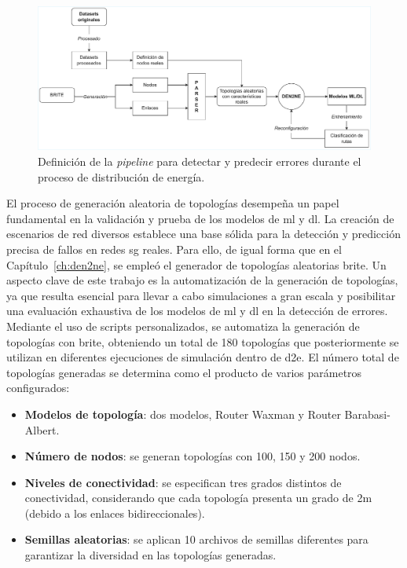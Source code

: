 \begin{figure}[H]
  \centering
  \includegraphics[width=\textwidth]{fig/06_fault_sg/fault_sg_08.drawio.pdf}
  \caption{Definición de la \textit{pipeline} para detectar y predecir errores durante el proceso de distribución de energía.}
  \label{fig:fault_sg_08}
\end{figure}


El proceso de generación aleatoria de topologías desempeña un papel fundamental en la validación y prueba de los modelos de \gls{ml} y \gls{dl}. La creación de escenarios de red diversos establece una base sólida para la detección y predicción precisa de fallos en redes \gls{sg} reales.  Para ello, de igual forma que en el Capítulo~\ref{ch:den2ne}, se empleó el generador de topologías aleatorias \gls{brite}. Un aspecto clave de este trabajo es la automatización de la generación de topologías, ya que resulta esencial para llevar a cabo simulaciones a gran escala y posibilitar una evaluación exhaustiva de los modelos de \gls{ml} y \gls{dl} en la detección de errores. Mediante el uso de scripts personalizados, se automatiza la generación de topologías con \gls{brite}, obteniendo un total de 180 topologías que posteriormente se utilizan en diferentes ejecuciones de simulación dentro de \gls{d2e}. El número total de topologías generadas se determina como el producto de varios parámetros configurados:  

\begin{itemize}
    \item \textbf{Modelos de topología}: dos modelos, Router Waxman y Router Barabasi-Albert.  
    
    \item \textbf{Número de nodos}: se generan topologías con 100, 150 y 200 nodos.  
    
    \item \textbf{Niveles de conectividad}: se especifican tres grados distintos de conectividad, considerando que cada topología presenta un grado de 2m (debido a los enlaces bidireccionales). 
    
    \item \textbf{Semillas aleatorias}: se aplican 10 archivos de semillas diferentes para garantizar la diversidad en las topologías generadas.  
\end{itemize}  

